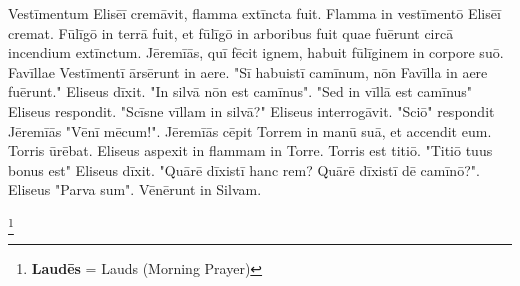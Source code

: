 Vestīmentum Elisēī cremāvit, flamma extīncta fuit. Flamma in vestīmentō Elisēī cremat. Fūlīgō in terrā fuit, et fūlīgō in arboribus fuit quae fuērunt circā incendium extīnctum. Jēremīās, quī fēcit ignem, habuit fūlīginem in corpore suō. Favīllae Vestīmentī ārsērunt in aere. "Sī habuistī camīnum, nōn Favīlla in aere fuērunt." Eliseus dīxit. "In silvā nōn est camīnus". "Sed in vīllā est camīnus" Eliseus respondit. "Scīsne vīllam in silvā?" Eliseus interrogāvit. "Sciō" respondit Jēremīās "Vēnī mēcum!". Jēremīās cēpit Torrem in manū suā, et accendit eum. Torris ūrēbat. Eliseus aspexit in flammam in Torre. Torris est titiō. "Titiō tuus bonus est" Eliseus dīxit. "Quārē dīxistī hanc rem? Quārē dīxistī dē camīnō?". Eliseus "Parva sum". Vēnērunt in Silvam. 

\footnote{\textbf{Laudēs} = Lauds (Morning Prayer)}

